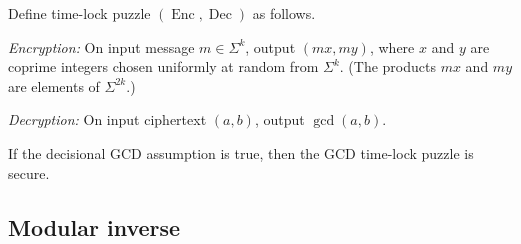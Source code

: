 \documentclass{article}
\newcommand{\Enc}{\operatorname{Enc}}
\newcommand{\Dec}{\operatorname{Dec}}
\newcommand{\Zp}{\mathbb{Z}^*_p}
\begin{document}
\begin{protocol}
  Define time-lock puzzle $(\Enc, \Dec)$ as follows.

  \emph{Encryption:} On input message $m \in \Sigma^k$, output $(mx, my)$, where $x$ and $y$ are coprime integers chosen uniformly at random from $\Sigma^k$. (The products $mx$ and $my$ are elements of $\Sigma^{2k}$.)

  \emph{Decryption:} On input ciphertext $(a, b)$, output $\gcd(a, b)$.
\end{protocol}

\begin{conjecture}
  If the decisional GCD assumption is true, then the GCD time-lock puzzle is secure.
\end{conjecture}

\subsection{Modular inverse}




\end{document}

